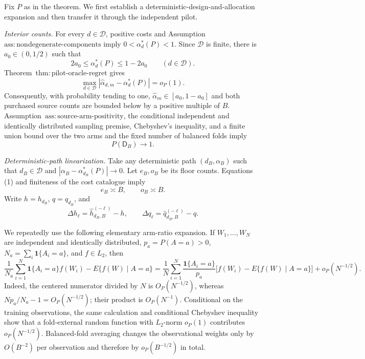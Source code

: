 Fix \(P\) as in the theorem.  We first establish a deterministic-design-and-allocation expansion and then transfer it through the independent pilot.

\emph{Interior counts.}
For every \(d\in\mathcal D\), positive costs and Assumption~\(\mathrm{ass{:}nondegenerate\text{-}components}\) imply \(0<\alpha_d^*(P)<1\).  Since \(\mathcal D\) is finite, there is \(a_0\in(0,1/2)\) such that
\[
 2a_0\le\alpha_d^*(P)\le1-2a_0
 \qquad(d\in\mathcal D).                                    \tag{1}
\]
Theorem~\(\mathrm{thm{:}pilot\text{-}oracle\text{-}regret}\) gives
\[
 \max_{d\in\mathcal D}
 |\widehat\alpha_{d,m}-\alpha_d^*(P)|=o_P(1).                 \tag{2}
\]
Consequently, with probability tending to one, \(\widehat\alpha_m\in[a_0,1-a_0]\) and both purchased source counts are bounded below by a positive multiple of \(B\).  Assumption~\(\mathrm{ass{:}source\text{-}arm\text{-}positivity}\), the conditional independent and identically distributed sampling premise, Chebyshev's inequality, and a finite union bound over the two arms and the fixed number of balanced folds imply
\[
 P(\mathsf D_B)\longrightarrow1.                              \tag{3}
\]

\emph{Deterministic-path linearization.}
Take any deterministic path \((d_B,\alpha_B)\) such that \(d_B\in\mathcal D\) and \(|\alpha_B-\alpha_{d_B}^*(P)|\to0\).  Let \(e_B,o_B\) be its floor counts.  Equations (1) and finiteness of the cost catalogue imply
\[
 e_B\asymp B,\qquad o_B\asymp B.                             \tag{4}
\]
Write \(h=h_{d_B}\), \(q=q_{d_B}\), and
\[
 \Delta h_\ell=\widehat h_{d_B,B}^{(-\ell)}-h,
 \qquad
 \Delta q_\ell=\widehat q_{d_B,B}^{(-\ell)}-q.
\]

We repeatedly use the following elementary arm-ratio expansion.  If \(W_1,\ldots,W_N\) are independent and identically distributed, \(p_a=P(A=a)>0\), \(N_a=\sum_i\mathbf1\{A_i=a\}\), and \(f\in L_2\), then
\[
 \frac1{N_a}\sum_{i=1}^N\mathbf1\{A_i=a\}f(W_i)
 -E\{f(W)\mid A=a\}
 =\frac1N\sum_{i=1}^N\frac{\mathbf1\{A_i=a\}}{p_a}
 \bigl[f(W_i)-E\{f(W)\mid A=a\}\bigr]
 +o_P(N^{-1/2}).                                               \tag{5}
\]
Indeed, the centered numerator divided by \(N\) is \(O_P(N^{-1/2})\), whereas \(Np_a/N_a-1=O_P(N^{-1/2})\); their product is \(O_P(N^{-1})\).  Conditional on the training observations, the same calculation and conditional Chebyshev inequality show that a fold-external random function with \(L_2\)-norm \(o_P(1)\) contributes \(o_P(N^{-1/2})\).  Balanced-fold averaging changes the observational weights only by \(O(B^{-2})\) per observation and therefore by \(o_P(B^{-1/2})\) in total.

